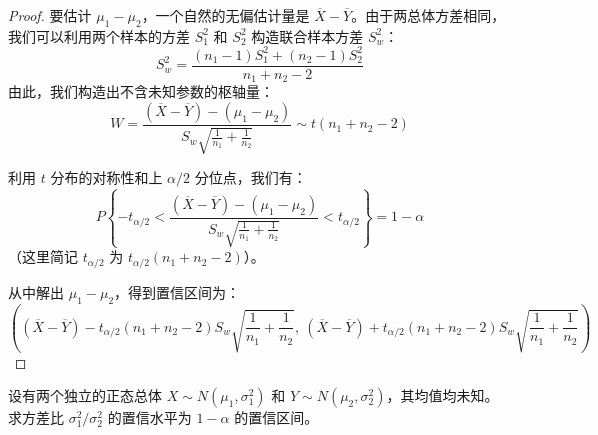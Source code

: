 \documentclass[lang=cn,11pt]{elegantbook}
\begin{document}
\begin{proof}
要估计 $\mu_1-\mu_2$，一个自然的无偏估计量是 $\overline{X}-\overline{Y}$。由于两总体方差相同，我们可以利用两个样本的方差 $S_1^2$ 和 $S_2^2$ 构造联合样本方差 $S_w^2$：
\begin{equation*}
S_w^2 = \frac{(n_1-1)S_1^2 + (n_2-1)S_2^2}{n_1+n_2-2}
\end{equation*}
由此，我们构造出不含未知参数的枢轴量：
\begin{equation*}
W=\frac{(\overline{X}-\overline{Y})-(\mu_1-\mu_2)}{S_w\sqrt{\frac{1}{n_1}+\frac{1}{n_2}}} \sim t(n_1+n_2-2)
\end{equation*}

利用 $t$ 分布的对称性和上 $\alpha/2$ 分位点，我们有：
\begin{equation*}
P\left\{-t_{\alpha/2} < \frac{(\overline{X}-\overline{Y})-(\mu_1-\mu_2)}{S_w\sqrt{\frac{1}{n_1}+\frac{1}{n_2}}} < t_{\alpha/2}\right\}=1-\alpha
\end{equation*}
（这里简记 $t_{\alpha/2}$ 为 $t_{\alpha/2}(n_1+n_2-2)$）。

从中解出 $\mu_1-\mu_2$，得到置信区间为：
\begin{equation*}
\left((\overline{X}-\overline{Y}) - t_{\alpha/2}(n_1+n_2-2)S_w\sqrt{\frac{1}{n_1}+\frac{1}{n_2}},\ (\overline{X}-\overline{Y}) + t_{\alpha/2}(n_1+n_2-2)S_w\sqrt{\frac{1}{n_1}+\frac{1}{n_2}}\right)
\end{equation*}
\end{proof}

\begin{exercise} \label{ex:ci_ratio_var_unknown_mu}
设有两个独立的正态总体 $X \sim N(\mu_1, \sigma_1^2)$ 和 $Y \sim N(\mu_2, \sigma_2^2)$，其均值均未知。求方差比 $\sigma_1^2/\sigma_2^2$ 的置信水平为 $1-\alpha$ 的置信区间。
\end{exercise}
\end{document}
